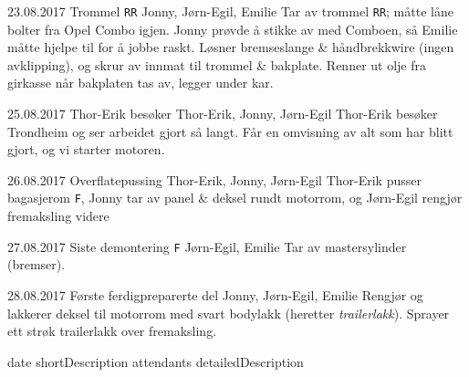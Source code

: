 \worklogitem
	{23.08.2017}
	{Trommel \texttt{RR}}
	{Jonny, Jørn-Egil, Emilie}
	{Tar av trommel \texttt{RR}; måtte låne bolter fra Opel Combo igjen. Jonny prøvde å stikke av med Comboen, så Emilie måtte hjelpe til for å jobbe raskt. Løsner bremseslange \& håndbrekkwire (ingen avklipping), og skrur av innmat til trommel \& bakplate. Renner ut olje fra girkasse når bakplaten tas av, legger under kar.}

\worklogitem
	{25.08.2017}
	{Thor-Erik besøker}
	{Thor-Erik, Jonny, Jørn-Egil}
	{Thor-Erik besøker Trondheim og ser arbeidet gjort så langt. Får en omvisning av alt som har blitt gjort, og vi starter motoren.}

\worklogitem
	{26.08.2017}
	{Overflatepussing}
	{Thor-Erik, Jonny, Jørn-Egil}
	{Thor-Erik pusser bagasjerom \texttt{F}, Jonny tar av panel \& deksel rundt motorrom, og Jørn-Egil rengjør fremaksling videre}

\worklogitem
	{27.08.2017}
	{Siste demontering \texttt{F}}
	{Jørn-Egil, Emilie}
	{Tar av mastersylinder (bremser).}

\worklogitem
	{28.08.2017}
	{Første ferdigpreparerte del}
	{Jonny, Jørn-Egil, Emilie}
	{Rengjør og lakkerer deksel til motorrom med svart bodylakk (heretter \textit{trailerlakk}). Sprayer ett strøk trailerlakk over fremaksling.}

\worklogitem
	{date}
	{shortDescription}
	{attendants}
	{detailedDescription}
